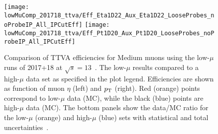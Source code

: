 	\begin{figure}  \centering
		\texttt{[image: lowMuComp\_201718\_ttva/Eff\_Eta1D22\_Aux\_Eta1D22\_LooseProbes\_noProbeIP\_All\_IPCutEff]}%
		\texttt{[image: lowMuComp\_201718\_ttva/Eff\_Pt1D20\_Aux\_Pt1D20\_LooseProbes\_noProbeIP\_All\_IPCutEff]}
	
		\caption{Comparison of TTVA efficiencies for Medium muons using the
			low-$\mu$ runs of 2017+18 at $\sqrt{s}=13$~\TeV{}.
			The low-$\mu$ results compared to a high-$\mu$ data set as specified in the plot legend.
			Efficiencies are shown as function of muon $\eta$ (left) and
			$p_{\text{T}}$ (right). Red (orange) points correspond to low-$\mu$ data (MC),
			while the black (blue) points are high-$\mu$ data (MC). The bottom
			panels show the data/MC ratio for the low-$\mu$ (orange) and
			high-$\mu$ (blue) sets with statistical and total
			uncertainties~\cite{int_note_muons}.}\label{app:fig:ttva-lowMu1}
	\end{figure}
		

